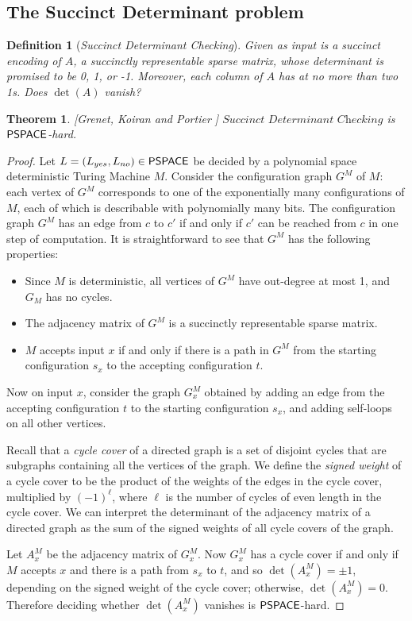 \documentclass[11pt]{article}
\newtheorem{theorem}{Theorem}
\newtheorem{definition}{Definition}
\theoremstyle{definition}
\theoremstyle{remark}
\newcommand\PSPACE{{\sf{PSPACE}}}
\newcommand\succdet{\textit{Succinct Determinant Checking}}
\begin{document}
\subsection{The Succinct Determinant problem}
\begin{definition}[\succdet]
Given as input is a succinct encoding of $A$, a succinctly representable sparse matrix, whose determinant is promised to be 0, 1, or -1. Moreover, each column of $A$ has at no more than two 1s.  Does $\det(A)$ vanish?
\end{definition}
\begin{theorem}\label{thm:succdet}[Grenet, Koiran and Portier \cite{GKP13}]
$\succdet$ is $\PSPACE$-hard.
\end{theorem}
\begin{proof}
Let $L=(L_{yes},L_{no}) \in \PSPACE$ be decided by a polynomial space deterministic Turing Machine $M$. Consider the configuration graph $G^M$ of $M$: each vertex of $G^M$ corresponds to one of the exponentially many configurations of $M$, each of which is describable with polynomially many bits. The configuration graph $G^M$ has an edge from $c$ to $c'$ if and only if $c'$ can be reached from $c$ in one step of computation. It is straightforward to see that $G^M$ has the following properties:
\begin{itemize}
\item Since $M$ is deterministic, all vertices of $G^M$ have out-degree at most 1, and $G_M$ has no cycles.
\item The adjacency matrix of $G^M$ is a succinctly representable sparse matrix.
\item $M$ accepts input $x$ if and only if there is a path in $G^M$ from the starting configuration $s_x$ to the accepting configuration $t$.
\end{itemize}

Now on input $x$, consider the graph $G^M_x$ obtained by adding an edge from the accepting configuration $t$ to the starting configuration $s_x$, and adding self-loops on all other vertices. 

Recall that a {\sl cycle cover} of a directed graph is a set of disjoint cycles that are subgraphs containing all the vertices of the graph.  We define the {\sl signed weight} of a cycle cover to be the product of the weights of the edges in the cycle cover, multiplied by $(-1)^\ell$, where $\ell$ is the number of cycles of even length in the cycle cover.  We can interpret the determinant of the adjacency matrix of a directed graph as the sum of the signed weights of all cycle covers of the graph. 

Let $A^M_x$ be the adjacency matrix of $G_x^M$.  Now $G^M_x$ has a cycle cover if and only if $M$ accepts $x$ and there is a path from $s_x$ to $t$, and so $\det(A^M_x) = \pm 1$, depending on the signed weight of the cycle cover; otherwise, $\det(A^M_x) = 0$. Therefore deciding whether $\det(A^M_x)$ vanishes is $\PSPACE$-hard.	
\end{proof}
\end{document}
